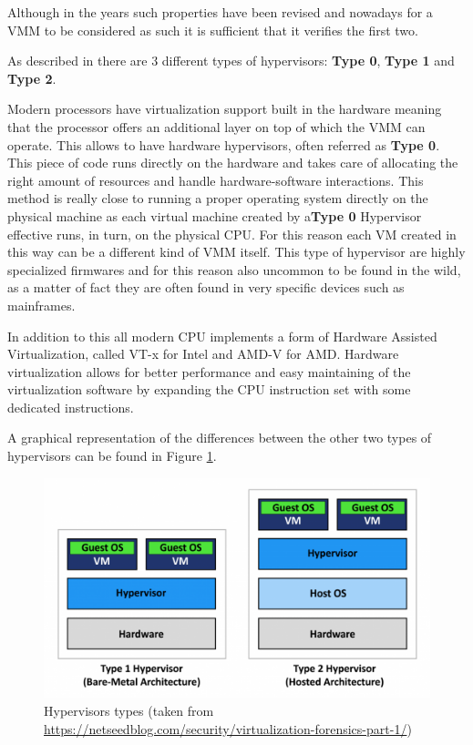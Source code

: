 Although in the years such properties have been revised and nowadays for a VMM to be considered as such it is sufficient that it verifies the first two. 

As described in\cite{os} there are 3 different types of hypervisors: \textbf{Type 0}, \textbf{Type 1} and \textbf{Type 2}. 

Modern processors have virtualization support built in the hardware meaning that the processor offers an additional layer on top of which the VMM can operate. This allows to have hardware hypervisors, often referred as \textbf{Type 0}. This piece of code runs directly on the hardware and takes care of allocating the right amount of resources and handle hardware-software interactions. This method is really close to running a proper operating system directly on the physical machine as each virtual machine created by a\textbf{Type 0} Hypervisor effective runs, in turn, on the physical CPU. For this reason each VM created in this way can be a different kind of VMM itself. This type of hypervisor are highly specialized firmwares and for this reason also uncommon to be found in the wild, as a matter of fact they are often found in very specific devices such as mainframes. 

In addition to this all modern CPU implements a form of Hardware Assisted Virtualization, called VT-x for Intel and AMD-V for AMD. Hardware virtualization allows for better performance and easy maintaining of the virtualization software by expanding the CPU instruction set with some dedicated instructions. 

A graphical representation of the differences between the other two types of hypervisors can be found in Figure \ref{fig:hip}.

\begin{figure}[htp]
\centering
\includegraphics[width=\linewidth]{images/hip.png}
\caption{Hypervisors types (taken from \url{https://netseedblog.com/security/virtualization-forensics-part-1/})}
\label{fig:hip}
\end{figure}



